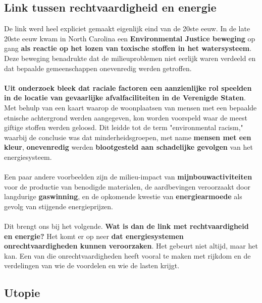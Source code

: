 \documentclass[../summary.tex]{subfiles}
\begin{document}
	\subsection{Link tussen rechtvaardigheid en energie}
	
	De link werd heel expliciet gemaakt eigenlijk eind van de 20ste eeuw. In de late 20ste eeuw kwam in North Carolina een \textbf{Environmental Justice beweging} op gang \textbf{als reactie op het lozen van toxische stoffen in het watersysteem}. Deze beweging benadrukte dat de milieuproblemen niet eerlijk waren verdeeld en dat bepaalde gemeenschappen onevenredig werden getroffen.\\
	\\
	\textbf{Uit onderzoek bleek dat raciale factoren een aanzienlijke rol speelden in de locatie van gevaarlijke afvalfaciliteiten in de Verenigde Staten}. Met behulp van een kaart waarop de woonplaatsen van mensen met een bepaalde etnische achtergrond werden aangegeven, kon worden voorspeld waar de meest giftige stoffen werden geloosd. Dit leidde tot de term "environmental racism," waarbij de conclusie was dat minderheidsgroepen, met name \textbf{mensen met een kleur}, \textbf{onevenredig} werden \textbf{blootgesteld aan schadelijke gevolgen} van het energiesysteem.\\
	\\
	Een paar andere voorbeelden zijn de milieu-impact van \textbf{mijnbouwactiviteiten} voor de productie van benodigde materialen, de aardbevingen veroorzaakt door langdurige \textbf{gaswinning}, en de opkomende kwestie van \textbf{energiearmoede} als gevolg van stijgende energieprijzen.\\
	\\
	Dit brengt ons bij het volgende. \textbf{Wat is dan de link met rechtvaardigheid en energie?} Het komt er op neer \textbf{dat energiesystemen onrechtvaardigheden kunnen veroorzaken}. Het gebeurt niet altijd, maar het kan. Een van die onrechtvaardigheden heeft vooral te maken met rijkdom en de verdelingen van wie de voordelen en wie de lasten krijgt.
	
	\subsection{Utopie}
	
\end{document}
